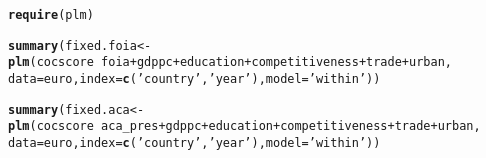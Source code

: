 \documentclass{article}\usepackage[]{graphicx}\usepackage[]{color}
\makeatletter
\newcommand{\hlstr}[1]{\textcolor[rgb]{0.192,0.494,0.8}{#1}}%
\newcommand{\hlopt}[1]{\textcolor[rgb]{0,0,0}{#1}}%
\newcommand{\hlstd}[1]{\textcolor[rgb]{0.345,0.345,0.345}{#1}}%
\newcommand{\hlkwb}[1]{\textcolor[rgb]{0.69,0.353,0.396}{#1}}%
\newcommand{\hlkwc}[1]{\textcolor[rgb]{0.333,0.667,0.333}{#1}}%
\newcommand{\hlkwd}[1]{\textcolor[rgb]{0.737,0.353,0.396}{\textbf{#1}}}%
\newenvironment{kframe}{%
 \def\at@end@of@kframe{}%
 \ifinner\ifhmode%
  \def\at@end@of@kframe{\end{minipage}}%
  \begin{minipage}{\columnwidth}%
 \fi\fi%
 \def\FrameCommand##1{\hskip\@totalleftmargin \hskip-\fboxsep
 \colorbox{shadecolor}{##1}\hskip-\fboxsep
     \hskip-\linewidth \hskip-\@totalleftmargin \hskip\columnwidth}%
 \MakeFramed {\advance\hsize-\width
   \@totalleftmargin\z@ \linewidth\hsize
   \@setminipage}}%
 {\par\unskip\endMakeFramed%
 \at@end@of@kframe}
\newenvironment{knitrout}{}{} %
\makeatother
\begin{document}
\begin{knitrout}
\color{fgcolor}\begin{kframe}
\begin{alltt}
\hlkwd{require}\hlstd{(plm)}
\end{alltt}


{\ttfamily\noindent\itshape\color{messagecolor}{\#\# Loading required package: plm}}

{\ttfamily\noindent\itshape\color{messagecolor}{\#\# Loading required package: Formula}}\begin{alltt}
\hlkwd{summary}\hlstd{(fixed.foia} \hlkwb{<-} \hlkwd{plm}\hlstd{(cocscore} \hlopt{~} \hlstd{foia} \hlopt{+} \hlstd{gdppc} \hlopt{+} \hlstd{education} \hlopt{+} \hlstd{competitiveness} \hlopt{+} \hlstd{trade} \hlopt{+} \hlstd{urban,}
                      \hlkwc{data} \hlstd{= euro,} \hlkwc{index} \hlstd{=} \hlkwd{c}\hlstd{(}\hlstr{'country'}\hlstd{,}\hlstr{'year'}\hlstd{),} \hlkwc{model}\hlstd{=}\hlstr{'within'}\hlstd{))}
\end{alltt}


{\ttfamily\noindent\bfseries\color{errorcolor}{\#\# Error in x[, !na.check]: incorrect number of dimensions}}\begin{alltt}
\hlkwd{summary}\hlstd{(fixed.aca} \hlkwb{<-} \hlkwd{plm}\hlstd{(cocscore} \hlopt{~} \hlstd{aca_pres} \hlopt{+} \hlstd{gdppc} \hlopt{+} \hlstd{education} \hlopt{+} \hlstd{competitiveness} \hlopt{+} \hlstd{trade} \hlopt{+} \hlstd{urban,}
                          \hlkwc{data} \hlstd{= euro,} \hlkwc{index} \hlstd{=} \hlkwd{c}\hlstd{(}\hlstr{'country'}\hlstd{,}\hlstr{'year'}\hlstd{),} \hlkwc{model}\hlstd{=}\hlstr{'within'}\hlstd{))}
\end{alltt}


{\ttfamily\noindent\bfseries\color{errorcolor}{\#\# Error in x[, !na.check]: incorrect number of dimensions}}\end{kframe}
\end{knitrout}
\end{document}
